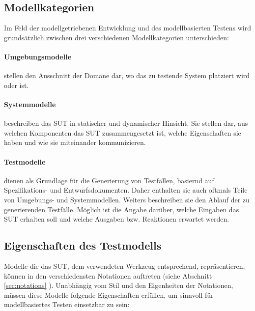\subsection{Modellkategorien}
Im Feld der modellgetriebenen Entwicklung und des modellbasierten Testens wird grundsätzlich zwischen drei verschiedenen Modellkategorien unterschieden:

\paragraph{Umgebungsmodelle} stellen den Ausschnitt der Domäne dar, wo das zu testende System platziert wird oder ist.
\paragraph{Systemmodelle} beschreiben das \Gls{SUT} in statischer und dynamischer Hinsicht. Sie stellen dar, aus welchen Komponenten das \Gls{SUT} zusammengesetzt ist, welche Eigenschaften sie haben und wie sie miteinander kommunizieren. 
\paragraph{Testmodelle} dienen als Grundlage für die Generierung von Testfällen, basiernd auf Spezifikations- und Entwurfsdokumenten. Daher enthalten sie auch oftmals Teile von Umgebungs- und Systemmodellen. Weiters beschreiben sie den Ablauf der zu generierenden Testfälle. Möglich ist die Angabe darüber, welche Eingaben das \Gls{SUT} erhalten soll und welche Ausgaben bzw. Reaktionen erwartet werden.

\subsection{Eigenschaften des Testmodells} 
\label{sec:eigenschaften_modell}
Modelle die das \gls{SUT}, dem verwendeten Werkzeug entsprechend, repräsentieren, können in den verschiedensten Notationen auftreten (siehe Abschnitt \ref{sec:notations} ). Unabhängig vom Stil und den Eigenheiten der Notationen, müssen diese Modelle folgende Eigenschaften erfüllen, um sinnvoll für modellbasiertes Testen einsetzbar zu sein:\\

